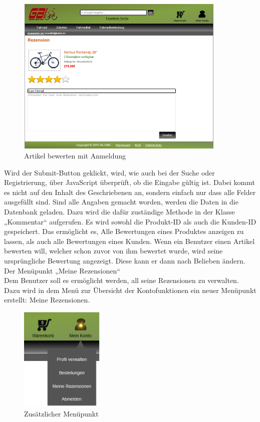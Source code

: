 \begin{figure}[H]
\begin{center}
\includegraphics[width=10cm]{Bilder/Michael_Abbildung12-ArtikelBewertenMitAnmeldung.png}
\end{center}
\caption{Artikel bewerten mit Anmeldung}
\end{figure}

Wird der Submit-Button geklickt, wird, wie auch bei der Suche oder Registrierung, über JavaScript überprüft, ob die Eingabe gültig ist. Dabei kommt es nicht auf den Inhalt des Geschriebenen an, sondern einfach nur dass alle Felder ausgefüllt sind. Sind alle Angaben gemacht worden, werden die Daten in die Datenbank geladen. Dazu wird die dafür zuständige Methode in der Klasse „Kommentar“ aufgerufen. Es wird sowohl die Produkt-ID als auch die Kunden-ID gespeichert. Das ermöglicht es, Alle Bewertungen eines Produktes anzeigen zu lassen, als auch alle Bewertungen eines Kunden. Wenn ein Benutzer einen  Artikel bewerten will, welcher schon zuvor von ihm bewertet wurde, wird seine ursprüngliche Bewertung angezeigt. Diese kann er dann nach Belieben ändern.
\\
Der Menüpunkt „Meine Rezensionen“
\\
Dem Benutzer soll es ermöglicht werden, all seine Rezensionen zu verwalten. Dazu wird in dem Menü zur Übersicht der Kontofunktionen ein neuer Menüpunkt erstellt: Meine Rezensionen. 

\begin{figure}[H]
\begin{center}
\includegraphics[width=4cm]{Bilder/Michael_Abbildung13-ZusaetzlicherMenuepunkt.png}
\end{center}
\caption{Zusätzlicher Menüpunkt}
\end{figure}

